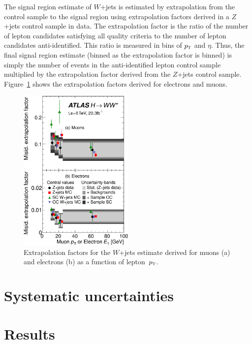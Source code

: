 The signal region estimate of $W$+jets is estimated by extrapolation from the control sample to the signal region using extrapolation factors derived in a $Z$+jets control sample in data. The extrapolation factor is the ratio of the number of lepton candidates satisfying all quality criteria to the number of lepton candidates anti-identified. This ratio is measured in bins of $p_{\textrm{\footnotesize\sc t}}$ and $\eta$. Thus, the final signal region estimate (binned as the extrapolation factor is binned) is simply the number of events in the anti-identified lepton control sample multiplied by the extrapolation factor derived from the $Z$+jets control sample. Figure~\ref{fig:VBF_extrap_Wjets} shows the extrapolation factors derived for electrons and muons. 

\begin{figure}[h!]
  \centering
  \captionsetup{justification=centering}
  \includegraphics[width=0.5\textwidth]{figures/VBF_Wjets_extrap}
  \caption{Extrapolation factors for the $W$+jets estimate derived for muons (a) and electrons (b) as a function of lepton~$p_{\textrm{\footnotesize\sc t}}$\cite{WW2015}.}
  \label{fig:VBF_extrap_Wjets}
\end{figure}






\section{Systematic uncertainties}

\section{Results}
